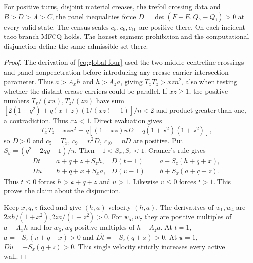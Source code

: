 \begin{lemma}\label{lem:global-opening}
For positive turns, disjoint material creases, the trefoil crossing data and $B>D>A>C$, the panel inequalities force $D=\det(F-E,Q_0-Q_1)>0$ at every valid state. The census scales $c_5,c_9,c_{10}$ are positive there. On each incident taco branch MFCQ holds. The honest segment prohibition and the computational disjunction define the same admissible set there.
\end{lemma}
\begin{proof}
The derivation of \eqref{eq:global-four} used the two middle centreline crossings and panel nonpenetration before introducing any crease-carrier intersection parameter. Thus $a>A_xh$ and $h>A_z a$, giving $T_xT_z>xzn^2$, also when testing whether the distant crease carriers could be parallel. If $xz\ge1$, the positive numbers $T_x/(xn),T_z/(zn)$ have sum $[2(1-q^2)+q(x+z)(1/(xz)-1)]/n<2$ and product greater than one, a contradiction. Thus $xz<1$. Direct evaluation gives
\[
 T_xT_z-xzn^2=q[(1-xz)nD-q(1+x^2)(1+z^2)],
\]
so $D>0$ and $c_5=T_x,\ c_9=n^2D,\ c_{10}=nD$ are positive. Put $S_y=(q^2+2qy-1)/n$. Then $-1<S_x,S_z<1$. Cramer's rule gives
\[
 \begin{aligned}
 Dt&=a+q+z+S_z h, &D(t-1)&=a+S_z(h+q+x),\\
 Du&=h+q+x+S_x a, &D(u-1)&=h+S_x(a+q+z).
 \end{aligned}
\]
Thus $t\le0$ forces $h>a+q+z$ and $u>1$. Likewise $u\le0$ forces $t>1$. This proves the claim about the disjunction.

Keep $x,q,z$ fixed and give $(h,a)$ velocity $(h,a)$. The derivatives of $w_1,w_4$ are $2xh/(1+x^2),2za/(1+z^2)>0$. For $w_5,w_7$ they are positive multiples of $a-A_xh$ and for $w_6,w_8$ positive multiples of $h-A_z a$. At $t=1$, $a=-S_z(h+q+x)>0$ and $D\dot t=-S_z(q+x)>0$. At $u=1$, $D\dot u=-S_x(q+z)>0$. This single velocity strictly increases every active wall.
\end{proof}
